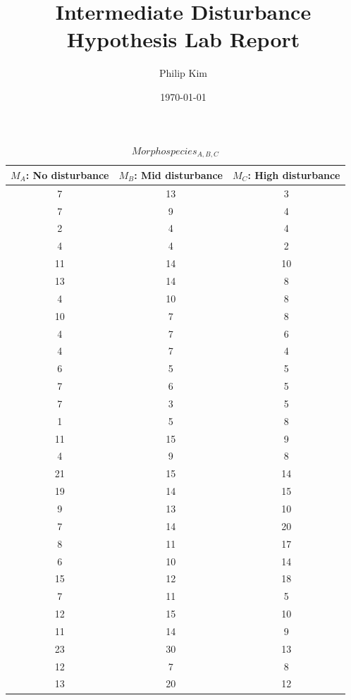 \documentclass{article}
\title{Intermediate Disturbance Hypothesis Lab Report}
\author{Philip Kim}
\date{\today}
\begin{document}
\maketitle
\begin{table}[h!]
  \begin{center}
    \caption{\(Morphospecies_{A,B,C}\)}\label{tab:table1}
    \begin{tabular}{|c|c|c|}\hline
      \(M_{A}\): No disturbance & \(M_{B}\): Mid disturbance & \(M_{C}\): High disturbance \\ \hline
      7 & 13 & 3 \\ \hline
      7 & 9 & 4 \\ \hline
      2 & 4 & 4 \\ \hline
      4 & 4 & 2 \\ \hline
      11 & 14 & 10 \\ \hline
      13 & 14 & 8 \\ \hline
      4 & 10 & 8 \\ \hline
      10 & 7 & 8 \\ \hline
      4 & 7 & 6 \\ \hline
      4 & 7 & 4 \\ \hline
      6 & 5 & 5 \\ \hline
      7 & 6 & 5 \\ \hline
      7 & 3 & 5 \\ \hline
      1 & 5 & 8 \\ \hline
      11 & 15 & 9 \\ \hline
      4 & 9 & 8 \\ \hline
      21 & 15 & 14 \\ \hline
      19 & 14 & 15 \\ \hline
      9 & 13 & 10 \\ \hline
      7 & 14 & 20 \\ \hline
      8 & 11 & 17 \\ \hline
      6 & 10 & 14 \\ \hline
      15 & 12 & 18 \\ \hline
      7 & 11 & 5 \\ \hline
      12 & 15 & 10 \\ \hline
      11 & 14 & 9 \\ \hline
      23 & 30 & 13 \\ \hline
      12 & 7 & 8 \\ \hline
      13 & 20 & 12 \\ \hline
    \end{tabular}
  \end{center}

\end{table}
\end{document}

